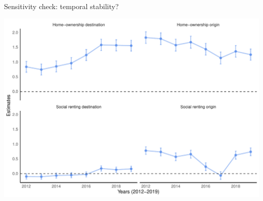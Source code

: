 \documentclass{beamer}
\begin{document}
\begin{frame}{Sensitivity check: temporal stability?}
			\begin{center}
	\includegraphics[width=\textwidth]{../../fig/temporal_variation}
\end{center}
\end{frame}
\end{document}
